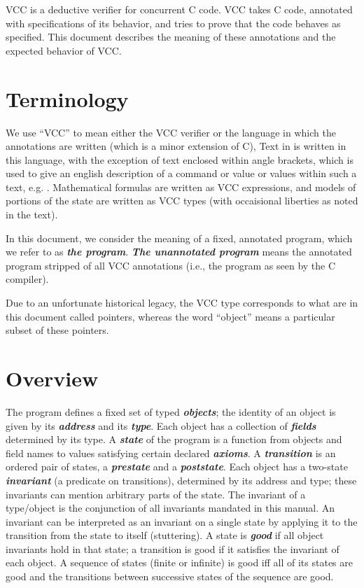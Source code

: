 \documentclass[preprint,nocopyrightspace]{sigplanconf}
\newcommand{\Def}[1]{\textit{\textbf{#1}}}
\begin{document}
\ifdense
\renewcommand{\labelitemi}{{\footnotesize \centeroncapheight{$\bullet$}}}
\fi

VCC is a deductive verifier for concurrent C code. VCC takes C code,
annotated with specifications of its behavior, and tries to prove that
the code behaves as specified. This document describes the meaning of these
annotations and the expected behavior of VCC. 

\section{Terminology}
We use ``VCC'' to mean either the VCC verifier or the language in
which the annotations are written (which is a minor extension of C),
Text in  is written in this language, with the
exception of text enclosed within angle brackets, which is used to
give an english description of a command or value or values within
such a text, e.g. . Mathematical
formulas are written as VCC expressions, and models of portions of the
state are written as VCC types (with occaisional liberties as noted in
the text). 

In this document, we consider the meaning of a fixed, annotated
program, which we refer to as \Def{the program}. \Def{The unannotated
program} means the annotated program stripped of all VCC annotations
(i.e., the program as seen by the C compiler).

Due to an unfortunate historical legacy, the VCC type \vcc{\object}
corresponds to what are in this document called pointers, whereas the
word ``object'' means a particular subset of these pointers.

\section{Overview}

The program defines a fixed set of typed \Def{objects}; the identity
of an object is given by its \Def{address} and its \Def{type}. Each
object has a collection of \Def{fields} determined by its type.
A \Def{state} of the program is a function from objects and field
names to values satisfying certain declared \Def{axioms}.
A \Def{transition} is an ordered pair of states, a \Def{prestate} and
a \Def{poststate}.  Each object has a two-state \Def{invariant} (a
predicate on transitions), determined by its address and type; these
invariants can mention arbitrary parts of the state.  The invariant of
a type/object is the conjunction of all invariants mandated in this
manual.  An invariant can be interpreted as an invariant on a single
state by applying it to the transition from the state to itself
(stuttering). A state is \Def{good} if all object invariants hold in
that state; a transition is good if it satisfies the invariant of
each object. A sequence of states (finite or infinite) is good iff all
of its states are good and the transitions between successive states
of the sequence are good.
\end{document}
